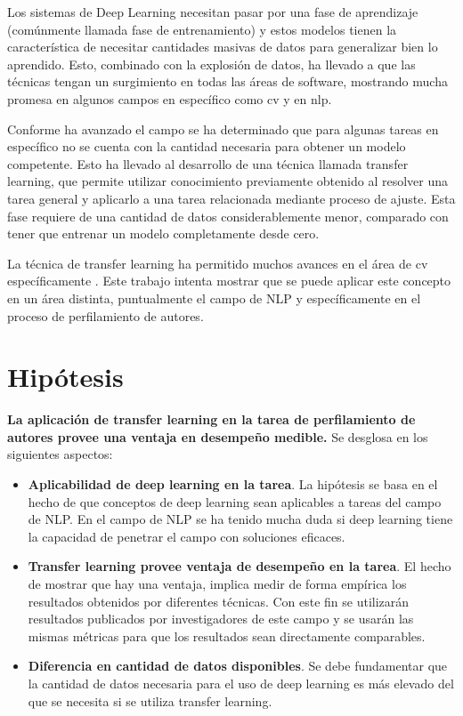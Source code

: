 Los sistemas de Deep Learning necesitan pasar por una fase de aprendizaje (comúnmente llamada fase de \gls{entrenamiento}) y estos modelos tienen la característica de necesitar cantidades masivas de datos para generalizar bien lo aprendido. Esto, combinado con la explosión de datos, ha llevado a que las técnicas tengan un surgimiento en todas las áreas de software, mostrando mucha promesa en algunos campos en específico como \gls{cv} \parencite{hoo2016deep} y en \gls{nlp}.

Conforme ha avanzado el campo se ha determinado que para algunas tareas en específico no se cuenta con la cantidad necesaria para obtener un modelo competente. Esto ha llevado al desarrollo de una técnica llamada transfer learning, que permite utilizar conocimiento previamente obtenido al resolver una tarea general y aplicarlo a una tarea relacionada mediante proceso de ajuste. Esta fase requiere de una cantidad de datos considerablemente menor, comparado con tener que entrenar un modelo completamente desde cero.

La técnica de transfer learning ha permitido muchos avances en el área de \gls{cv} específicamente \parencite{hoo2016deep}. Este trabajo intenta mostrar que se puede aplicar este concepto en un área distinta, puntualmente el campo de NLP y específicamente en el proceso de \gls{perfilamiento de autores}.

\section{Hipótesis}

\textbf{La aplicación de transfer learning en la tarea de perfilamiento de autores provee una ventaja en desempeño medible.} Se desglosa en los siguientes aspectos:

\begin{itemize}
\item \textbf{Aplicabilidad de deep learning en la tarea}. La hipótesis se basa en el hecho de que conceptos de deep learning sean aplicables a tareas del campo de NLP. En el campo de NLP se ha tenido mucha duda si deep learning tiene la capacidad de penetrar el campo con soluciones eficaces.

\item \textbf{Transfer learning provee ventaja de desempeño en la tarea}. El hecho de mostrar que hay una ventaja, implica medir de forma empírica los resultados obtenidos por diferentes técnicas. Con este fin se utilizarán resultados publicados por investigadores de este campo y se usarán las mismas métricas para que los resultados sean directamente comparables.

\item \textbf{Diferencia en cantidad de datos disponibles}. Se debe fundamentar que la cantidad de datos necesaria para el uso de deep learning es más elevado del que se necesita si se utiliza transfer learning.
\end{itemize}

